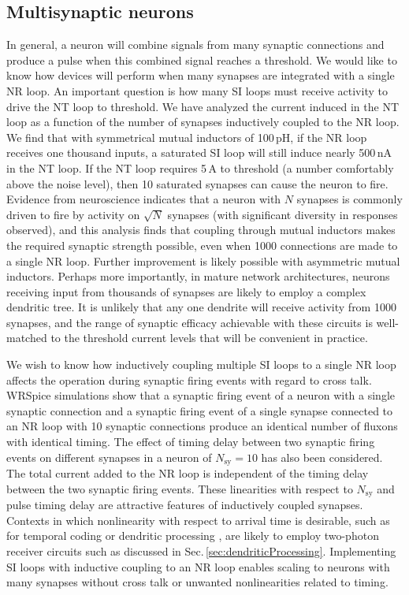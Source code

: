 \documentclass[twocolumn]{article}
\begin{document}
\subsection{\label{sec:scaling}Multisynaptic neurons} 
In general, a neuron will combine signals from many synaptic connections and produce a pulse when this combined signal reaches a threshold. We would like to know how devices will perform when many synapses are integrated with a single NR loop. An important question is how many SI loops must receive activity to drive the NT loop to threshold. We have analyzed the current induced in the NT loop as a function of the number of synapses inductively coupled to the NR loop. We find that with symmetrical mutual inductors of 100\,pH, if the NR loop receives one thousand inputs, a saturated SI loop will still induce nearly 500\,nA in the NT loop. If the NT loop requires 5\,\textmu A to threshold (a number comfortably above the noise level), then 10 saturated synapses can cause the neuron to fire. Evidence from neuroscience indicates that a neuron with $N$ synapses is commonly driven to fire by activity on $\sqrt{N}$ synapses \cite{vrso1996,vora2005} (with significant diversity in responses observed), and this analysis finds that coupling through mutual inductors makes the required synaptic strength possible, even when 1000 connections are made to a single NR loop. Further improvement is likely possible with asymmetric mutual inductors. Perhaps more importantly, in mature network architectures, neurons receiving input from thousands of synapses are likely to employ a complex dendritic tree. It is unlikely that any one dendrite will receive activity from 1000 synapses, and the range of synaptic efficacy achievable with these circuits is well-matched to the threshold current levels that will be convenient in practice. 

We wish to know how inductively coupling multiple SI loops to a single NR loop affects the operation during synaptic firing events with regard to cross talk. WRSpice simulations show that a synaptic firing event of a neuron with a single synaptic connection and a synaptic firing event of a single synapse connected to an NR loop with 10 synaptic connections produce an identical number of fluxons with identical timing. The effect of timing delay between two synaptic firing events on different synapses in a neuron of $N_{\mathrm{sy}} = 10$ has also been considered. The total current added to the NR loop is independent of the timing delay between the two synaptic firing events. These linearities with respect to $N_{\mathrm{sy}}$ and pulse timing delay are attractive features of inductively coupled synapses. Contexts in which nonlinearity with respect to arrival time is desirable, such as for temporal coding \cite{thde2001,sase2001} or dendritic processing \cite{brcl2010,haah2015}, are likely to employ two-photon receiver circuits such as discussed in Sec.\,\ref{sec:dendriticProcessing}. Implementing SI loops with inductive coupling to an NR loop enables scaling to neurons with many synapses without cross talk or unwanted nonlinearities related to timing.
 
\end{document}
